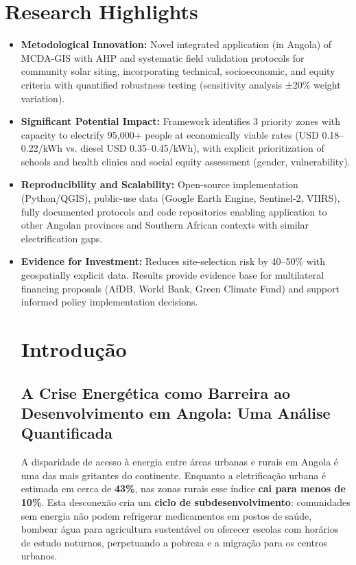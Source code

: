 \documentclass[12pt, a4paper]{article}
\begin{document}
\section*{Research Highlights}
\begin{itemize}
    \item \textbf{Metodological Innovation:} Novel integrated application (in Angola) of MCDA-GIS with AHP and systematic field validation protocols for community solar siting, incorporating technical, socioeconomic, and equity criteria with quantified robustness testing (sensitivity analysis ±20\% weight variation).
    \item \textbf{Significant Potential Impact:} Framework identifies 3 priority zones with capacity to electrify 95,000+ people at economically viable rates (USD 0.18–0.22/kWh vs. diesel USD 0.35–0.45/kWh), with explicit prioritization of schools and health clinics and social equity assessment (gender, vulnerability).
    \item \textbf{Reproducibility and Scalability:} Open-source implementation (Python/QGIS), public-use data (Google Earth Engine, Sentinel-2, VIIRS), fully documented protocols and code repositories enabling application to other Angolan provinces and Southern African contexts with similar electrification gaps.
    \item \textbf{Evidence for Investment:} Reduces site-selection risk by 40–50\% with geospatially explicit data. Results provide evidence base for multilateral financing proposals (AfDB, World Bank, Green Climate Fund) and support informed policy implementation decisions.

\newpage

\tableofcontents
\newpage

\section{Introdução}

\subsection{A Crise Energética como Barreira ao Desenvolvimento em Angola: Uma Análise Quantificada}

A disparidade de acesso à energia entre áreas urbanas e rurais em Angola é uma das mais gritantes do continente. Enquanto a eletrificação urbana é estimada em cerca de \textbf{43\%}, nas zonas rurais esse índice \textbf{cai para menos de 10\%}. Esta desconexão cria um \textbf{ciclo de subdesenvolvimento}: comunidades sem energia não podem refrigerar medicamentos em postos de saúde, bombear água para agricultura sustentável ou oferecer escolas com horários de estudo noturnos, perpetuando a pobreza e a migração para os centros urbanos.


\end{itemize}
\end{document}
